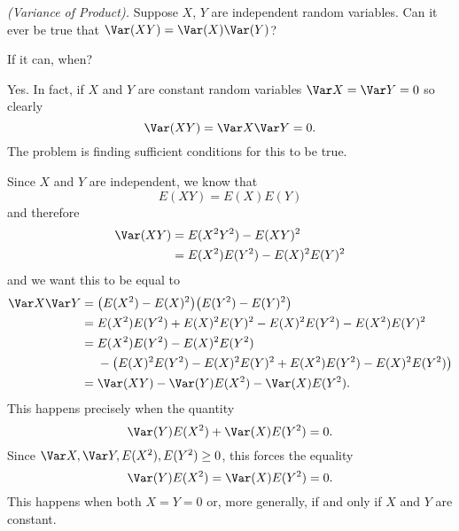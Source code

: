 \begin{problem}[Handout 9, \# 14]
  \emph{(Variance of Product).} Suppose \(X\), \(Y\) are independent
  random variables. Can it ever be true that \(\Var(XY)=\Var(X)\Var(Y)\)?

  \noindent If it can, when?
\end{problem}
\begin{solution}
  Yes. In fact, if \(X\) and \(Y\) are constant random variables \(\Var
  X=\Var Y=0\) so clearly
  \[
    \Var(XY)=\Var X\Var Y=0.
  \]
  The problem is finding sufficient conditions for this to be true.

  Since \(X\) and \(Y\) are independent, we know that
  \[
    E(XY)=E(X)E(Y)
  \]
  and therefore
  \begin{align*}
    \Var(XY)
    &=E(X^2Y^2)-E(XY)^2\\
    &=E(X^2)E(Y^2)-E(X)^2E(Y)^2
  \end{align*}
  and we want this to be equal to
  \begin{align*}
    \Var X\Var Y
    &=\bigl(E(X^2)-E(X)^2\bigr)
      \bigl(E(Y^2)-E(Y)^2\bigr)\\
    &=E(X^2)E(Y^2)+E(X)^2E(Y)^2-E(X)^2E(Y^2)-E(X^2)E(Y)^2\\
    &=E(X^2)E(Y^2)-E(X)^2E(Y^2)\\
    &\phantom{{}={}}-\bigl(E(X)^2E(Y^2)-E(X)^2E(Y)^2+E(X^2)E(Y^2)-E(X)^2E(Y^2)\bigr)\\
    &=\Var(XY)-\Var(Y) E(X^2)-\Var(X)E(Y^2).
  \end{align*}
  This happens precisely when the quantity
  \[
    \Var(Y) E(X^2)+\Var(X)E(Y^2)=0.
  \]
  Since \(\Var X,\Var Y,E(X^2),E(Y^2)\geq 0\), this forces the equality
  \[
    \Var(Y) E(X^2)=\Var(X)E(Y^2)=0.
  \]
  This happens when both \(X=Y=0\) or, more generally, if and only if \(X\)
  and \(Y\) are constant.
\end{solution}

